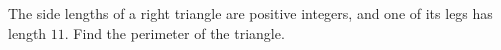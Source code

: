 The side lengths of a right triangle are positive integers, and one of its legs has length $11$. Find the perimeter of the triangle.
